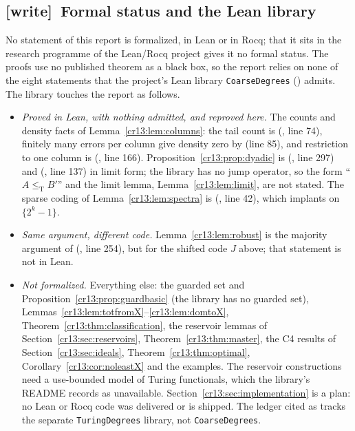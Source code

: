 \documentclass[11pt,letterpaper]{article}
\theoremstyle{definition}
\theoremstyle{remark}\newtheorem{remark}[theorem]{Remark}
\numberwithin{equation}{section}
\newcommand{\leT}{\leq_{\mathrm T}}
\newcommand{\wtag}{\textup{[write]}}
\begin{document}
\subsection{\wtag\ Formal status and the Lean library}
\label{cr13:sec:wformal}
No statement of this report is formalized, in Lean or in Rocq; that it sits in the research programme of the Lean/Rocq project  gives it no formal status. The proofs use no published theorem as a black box, so the report relies on none of the eight statements that the project's Lean library \texttt{CoarseDegrees} () admits. The library touches the report as follows.
\begin{itemize}
\item \emph{Proved in Lean, with nothing admitted, and reproved here.} The counts and density facts of Lemma~\ref{cr13:lem:columns}: the tail count is  (, line 74), finitely many errors per column give density zero by  (line 85), and restriction to one column is  (, line 166). Proposition~\ref{cr13:prop:dyadic} is  (, line 297) and  (, line 137) in limit form; the library has no jump operator, so the form ``$A\leT B'$'' and the limit lemma, Lemma~\ref{cr13:lem:limit}, are not stated. The sparse coding of Lemma~\ref{cr13:lem:spectra} is  (, line 42), which implants on $\{2^k-1\}$.
\item \emph{Same argument, different code.} Lemma~\ref{cr13:lem:robust} is the majority argument of  (, line 254), but for the shifted code $J$ above; that statement is not in Lean.
\item \emph{Not formalized.} Everything else: the guarded set and Proposition~\ref{cr13:prop:guardbasic} (the library has no guarded set), Lemmas~\ref{cr13:lem:totfromX}--\ref{cr13:lem:domtoX}, Theorem~\ref{cr13:thm:classification}, the reservoir lemmas of Section~\ref{cr13:sec:reservoirs}, Theorem~\ref{cr13:thm:master}, the C4 results of Section~\ref{cr13:sec:ideals}, Theorem~\ref{cr13:thm:optimal}, Corollary~\ref{cr13:cor:noleastX} and the examples. The reservoir constructions need a use-bounded model of Turing functionals, which the library's README records as unavailable. Section~\ref{cr13:sec:implementation} is a plan: no Lean or Rocq code was delivered or is shipped. The ledger cited as \cite{Coverage} tracks the separate \texttt{TuringDegrees} library, not \texttt{CoarseDegrees}.
\end{itemize}
\end{document}
